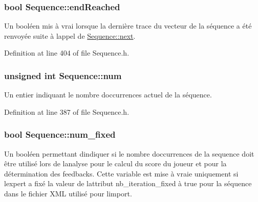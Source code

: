 \subsubsection[{\texorpdfstring{end\+Reached}{endReached}}]{\setlength{\rightskip}{0pt plus 5cm}bool Sequence\+::end\+Reached\hspace{0.3cm}{\ttfamily [protected]}}\hypertarget{class_sequence_a37ae535e71d53216a85e16bec941410d}{}\label{class_sequence_a37ae535e71d53216a85e16bec941410d}
Un booléen mis à vrai lorsque la dernière trace du vecteur de la séquence a été renvoyée suite à l\textquotesingle{}appel de \hyperlink{class_sequence_a5c6f4d1232eb3fddc256a2d654c48c6b}{Sequence\+::next}. 

Definition at line 404 of file Sequence.\+h.

\subsubsection[{\texorpdfstring{num}{num}}]{\setlength{\rightskip}{0pt plus 5cm}unsigned int Sequence\+::num\hspace{0.3cm}{\ttfamily [protected]}}\hypertarget{class_sequence_a9283bd1da021b06eeaed1028b1e7069e}{}\label{class_sequence_a9283bd1da021b06eeaed1028b1e7069e}
Un entier indiquant le nombre d\textquotesingle{}occurrences actuel de la séquence. 

Definition at line 387 of file Sequence.\+h.

\subsubsection[{\texorpdfstring{num\+\_\+fixed}{num_fixed}}]{\setlength{\rightskip}{0pt plus 5cm}bool Sequence\+::num\+\_\+fixed\hspace{0.3cm}{\ttfamily [protected]}}\hypertarget{class_sequence_ae495f3d3267ac936660920ab13b2316e}{}\label{class_sequence_ae495f3d3267ac936660920ab13b2316e}
Un booléen permettant d\textquotesingle{}indiquer si le nombre d\textquotesingle{}occurrences de la sequence doit être utilisé lors de l\textquotesingle{}analyse pour le calcul du score du joueur et pour la détermination des feedbacks. Cette variable est mise à vraie uniquement si l\textquotesingle{}expert a fixé la valeur de l\textquotesingle{}attribut \textquotesingle{}nb\+\_\+iteration\+\_\+fixed\textquotesingle{} à \textquotesingle{}true\textquotesingle{} pour la séquence dans le fichier X\+ML utilisé pour l\textquotesingle{}import. 

